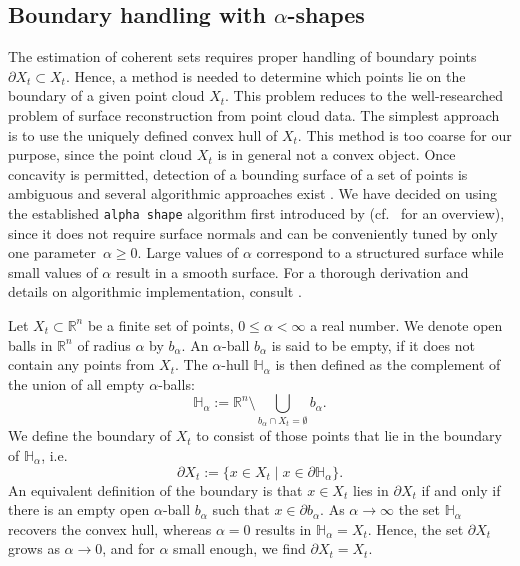 \subsection{Boundary handling with $\alpha$-shapes}\label{sec:CS_alpha_shapes}
The estimation of coherent sets requires proper handling of boundary points $\partial X_t \subset X_t$. Hence, a method is needed to determine which points lie on the boundary of a given point cloud $X_t$. This problem reduces to the well-researched problem of surface reconstruction from point cloud data. The simplest approach is to use the uniquely defined convex hull of $X_t$. This method is too coarse for our purpose, since the point cloud $X_t$ is in general not a convex object. Once concavity is permitted, detection of a bounding surface of a set of points is ambiguous and several algorithmic approaches exist \parencite{bergerSurveySurfaceReconstruction2017}. We have decided on using the established \texttt{alpha shape} algorithm first introduced by \textcite{edelsbrunnerShapeSetPoints1983} (cf.~\textcite{edelsbrunnerAlphaShapesSurvey2012} for an overview), since it does not require surface normals and can be conveniently tuned by only one parameter~$\alpha \geq 0$. Large values of $\alpha$ correspond to a structured surface while small values of $\alpha$ result in a smooth surface. For a thorough derivation and details on algorithmic implementation, consult \textcite{edelsbrunnerThreedimensionalAlphaShapes1994}.

Let $X_t \subset \mathbb{R}^n$ be a finite set of points, $0 \leq \alpha < \infty$ a real number. We denote open balls in $\mathbb{R}^n$ of radius $\alpha$ by $b_{\alpha}$. An $\alpha$-ball $b_\alpha$ is said to be empty, if it does not contain any points from $X_t$. The $\alpha$-hull $\mathbb{H}_{\alpha}$ is then defined as the complement of the union of all empty $\alpha$-balls:
\begin{equation}
    \mathbb{H}_{\alpha} := \mathbb{R}^n \setminus \bigcup_{b_{\alpha} \cap X_t = \emptyset} b_{\alpha}.
\end{equation}
We define the boundary of $X_t$ to consist of those points that lie in the boundary of $\mathbb H_\alpha$, i.e.
\begin{equation*}
    \partial X_t := \{x \in X_t \mid x \in \partial \mathbb H_\alpha\}.
\end{equation*}
An equivalent definition of the boundary is that $x\in X_t$ lies in $\partial X_t$ if and only if there is an empty open $\alpha$-ball $b_\alpha$ such that $x\in \partial b_\alpha$. As $\alpha \rightarrow \infty$ the set $\mathbb{H}_\alpha$ recovers the convex hull, whereas $\alpha = 0$ results in $\mathbb H_\alpha = X_t$. Hence, the set $\partial X_t$ grows as $\alpha \to 0$, and for $\alpha$ small enough, we find $\partial X_t = X_t$.

